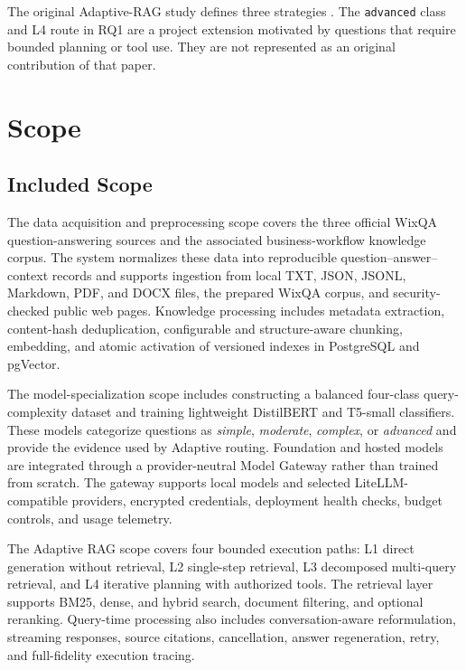 The original Adaptive-RAG study defines three strategies
\cite{jeong2024adaptiverag}. The \texttt{advanced} class and L4 route in RQ1
are a project extension motivated by questions that require bounded planning or
tool use. They are not represented as an original contribution of that paper.

\section{Scope}

\subsection{Included Scope}

The data acquisition and preprocessing scope covers the three official WixQA
question-answering sources and the associated business-workflow knowledge
corpus. The system normalizes these data into reproducible question--answer--
context records and supports ingestion from local TXT, JSON, JSONL, Markdown,
PDF, and DOCX files, the prepared WixQA corpus, and security-checked public web
pages. Knowledge processing includes metadata extraction, content-hash
deduplication, configurable and structure-aware chunking, embedding, and
atomic activation of versioned indexes in PostgreSQL and pgVector.

The model-specialization scope includes constructing a balanced four-class
query-complexity dataset and training lightweight DistilBERT and T5-small
classifiers. These models categorize questions as \textit{simple},
\textit{moderate}, \textit{complex}, or \textit{advanced} and provide the
evidence used by Adaptive routing. Foundation and hosted models are integrated
through a provider-neutral Model Gateway rather than trained from scratch. The
gateway supports local models and selected LiteLLM-compatible providers,
encrypted credentials, deployment health checks, budget controls, and usage
telemetry.

The Adaptive RAG scope covers four bounded execution paths: L1 direct
generation without retrieval, L2 single-step retrieval, L3 decomposed
multi-query retrieval, and L4 iterative planning with authorized tools. The
retrieval layer supports BM25, dense, and hybrid search, document filtering,
and optional reranking. Query-time processing also includes conversation-aware
reformulation, streaming responses, source citations, cancellation, answer
regeneration, retry, and full-fidelity execution tracing.

